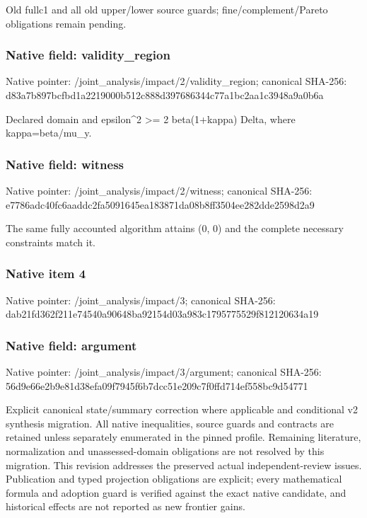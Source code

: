 \documentclass[10pt,a4paper]{article}
\begin{document}
\begingroup\raggedright\sloppy Old fullc1 and all old upper/\allowbreak{}lower source guards;\allowbreak{} fine/\allowbreak{}complement/\allowbreak{}Pareto obligations remain pending.\par\endgroup

\subsubsection{Native field: validity\_\allowbreak{}region}
Native pointer: /joint\_\allowbreak{}analysis/impact/2/validity\_\allowbreak{}region; canonical SHA-256: d83a7b897bcfbd1a2219000b512c888d397686344c77a1bc2aa1c3948a9a0b6a

\begingroup\raggedright\sloppy Declared domain and epsilon\textasciicircum{}2 >=\allowbreak{} 2 beta(1+kappa) Delta,\allowbreak{} where kappa=\allowbreak{}beta/\allowbreak{}mu\_\allowbreak{}y.\par\endgroup

\subsubsection{Native field: witness}
Native pointer: /joint\_\allowbreak{}analysis/impact/2/witness; canonical SHA-256: e7786adc40fc6aaddc2fa5091645ea183871da08b8ff3504ee282dde2598d2a9

\begingroup\raggedright\sloppy The same fully accounted algorithm attains (0,\allowbreak{} 0) and the complete necessary constraints match it.\par\endgroup

\subsubsection{Native item 4}
Native pointer: /joint\_\allowbreak{}analysis/impact/3; canonical SHA-256: dab21fd362f211e74540a90648ba92154d03a983c1795775529f812120634a19

\subsubsection{Native field: argument}
Native pointer: /joint\_\allowbreak{}analysis/impact/3/argument; canonical SHA-256: 56d9e66e2b9e81d38efa09f7945f6b7dcc51e209c7f0ffd714ef558bc9d54771

\begingroup\raggedright\sloppy Explicit canonical state/\allowbreak{}summary correction where applicable and conditional v2 synthesis migration. All native inequalities,\allowbreak{} source guards and contracts are retained unless separately enumerated in the pinned profile. Remaining literature,\allowbreak{} normalization and unassessed-domain obligations are not resolved by this migration. This revision addresses the preserved actual independent-review issues. Publication and typed projection obligations are explicit;\allowbreak{} every mathematical formula and adoption guard is verified against the exact native candidate,\allowbreak{} and historical effects are not reported as new frontier gains.\par\endgroup
\end{document}
